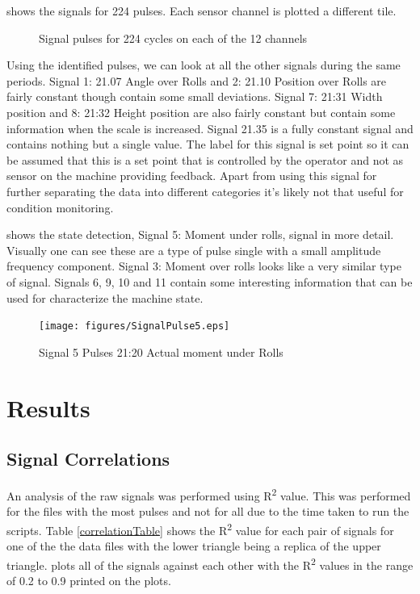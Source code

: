 \documentclass[]{article}
\begin{document}
 shows the signals for 224 pulses. Each sensor channel is plotted a different tile. 
\begin{figure}[H]
    \caption{Signal pulses for 224 cycles on each of the 12 channels}
    \label{fig:SignalPulses}
\end{figure}

Using the identified pulses, we can look at all the other signals during the same periods. Signal 1: 21.07 Angle over Rolls and 2: 21.10 Position over Rolls are fairly constant though contain some small deviations. Signal 7: 21:31 Width position and  8: 21:32 Height position are also fairly constant but contain some information when the scale is increased. Signal 21.35 is a fully constant signal and contains nothing but a single value. The label for this signal is set point so it can be assumed that this is a set point that is controlled by the operator and not as sensor on the machine providing feedback. Apart from using this signal for further separating the data into different categories it's likely not that useful for condition monitoring.

 shows the state detection, Signal 5: Moment under rolls, signal in more detail. Visually one can see these are a type of pulse single with a small amplitude frequency component. Signal 3: Moment over rolls looks like a very similar type of signal. Signals 6, 9, 10 and 11 contain some interesting information that can be used for characterize the machine state.

\begin{figure}[H]
    \centering
    \texttt{[image: figures/SignalPulse5.eps]}
    \caption{Signal 5 Pulses 21:20 Actual moment under Rolls}
    \label{fig:SignalPulse5}
\end{figure}

\section{Results}
\subsection{Signal Correlations}
An analysis of the raw signals was performed using R\textsuperscript{2} value. This was performed for the files with the most pulses and not for all due to the time taken to run the scripts. Table \ref{correlationTable} shows the R\textsuperscript{2} value for each pair of signals for one of the the data files with the lower triangle being a replica of the upper triangle.  plots all of the signals against each other with the R\textsuperscript{2} values in the range of 0.2 to 0.9 printed on the plots.
\end{document}
